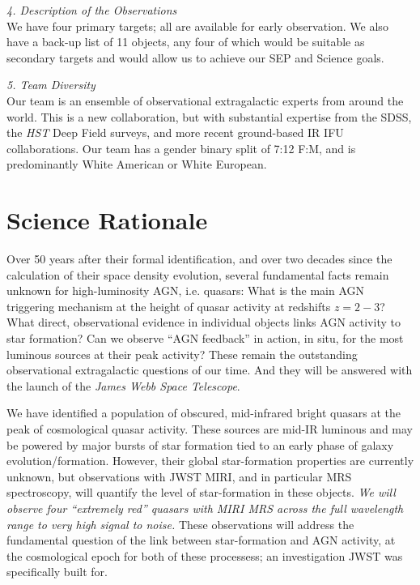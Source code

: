 \smallskip \smallskip
\noindent
{\it 4. Description of the Observations}\\
We have four primary targets; all are available for early observation.
We also have a back-up list of 11 objects, any four of which would be
suitable as secondary targets and would allow us to achieve our SEP
and Science goals.

\smallskip \smallskip
\noindent
{\it 5. Team Diversity}\\
Our team is an ensemble of observational extragalactic experts from
around the world.  This is a new collaboration, but with substantial
expertise from the SDSS, the {\it HST} Deep Field surveys, and more
recent ground-based IR IFU collaborations.  Our team has a gender
binary split of 7:12 F:M, and is predominantly White American or White
European.



\section*{Science Rationale}
\vspace{-6pt}
\noindent
Over 50 years after their formal identification, and over two decades
since the calculation of their space density evolution, several
fundamental facts remain unknown for high-luminosity AGN,
i.e. quasars: What is the main AGN triggering mechanism at the height
of quasar activity at redshifts $z=2-3$? What direct,
observational evidence in individual objects links AGN activity
to star formation?  Can we observe ``AGN feedback'' in action, in situ,  
for the most luminous sources at their peak activity? These remain the
outstanding observational extragalactic questions of our time. And
they will be answered with the launch of the {\it James Webb Space
Telescope}.

\smallskip \smallskip
\noindent
We have identified a population of obscured, mid-infrared bright
quasars at the peak of cosmological quasar activity.  These sources are
mid-IR luminous and may be powered by major bursts of star formation
tied to an early phase of galaxy evolution/formation. However, their
global star-formation properties are currently unknown, but
observations with JWST MIRI, and in particular MRS spectroscopy, will
quantify the level of star-formation in these objects.  {\it We will
observe four ``extremely red'' quasars with MIRI MRS across the full wavelength range to
very high signal to noise.} These observations will address the
fundamental question of the link between star-formation and AGN
activity, at the cosmological epoch for both of these processess; an
investigation JWST was specifically built for.

